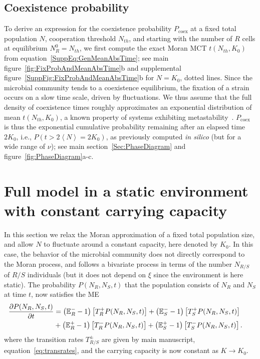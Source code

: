 \documentclass{article}
\begin{document}
\subsection{Coexistence probability}\label{SuppSec:CoexProb}
To derive an expression for the coexistence probability \(P_{\text{coex}}\) at a fixed total population \(N\), cooperation threshold \(N_{th}\), and starting with the number of $R$ cells at equilibrium \(N_R^0=N_{th}\), we first compute the exact Moran MCT \(t(N_{th},K_{0})\) from equation~\eqref{SuppEq:GenMeanAbsTime}; see main figure~\ref{fig:FixProbAndMeanAbsTime}b and supplemental figure~\ref{SuppFig:FixProbAndMeanAbsTime}b for \(N=K_{0}\), dotted lines. Since the microbial community tends to a coexistence equilibrium, the fixation of a strain occurs on a slow time scale, driven by fluctuations. We thus assume that the full density of coexistence times roughly approximates an exponential distribution of mean \(t(N_{th},K_{0})\), a known property of systems exhibiting metastability~\cite{assaf2017}. \(P_{\text{coex}}\) is thus the exponential cumulative probability remaining after an elapsed time \(2K_{0}\), i.e., \(P\left(t>2\left<N\right>=2K_{0}\right)\), as previously computed {\it in silico} (but for a wide range of \(\nu\)); see main section~\ref{Sec:PhaseDiagram} and figure~\ref{fig:PhaseDiagram}a-c.


\section{Full model in a static environment with constant carrying capacity}\label{SuppSec:FluctNFixK}

In this section we relax the Moran approximation of a fixed total population size, and allow \(N\) to fluctuate around a constant capacity, here denoted by \(K_{0}\). In this case, the behavior of the microbial community does not directly correspond to the Moran process, and follows a bivariate process in terms of the number $N_{R/S}$ of $R/S$ individuals (but it does not depend on $\xi$ since the environment is here static). The probability $P(N_R,N_S,t)$ that the population consists of $N_R$ and $N_S$ at time $t$, now satisfies the ME
\begin{align*}
\label{eq:MEbis}
\hspace{-5mm}
\frac{\partial P(N_R,N_S,t)}{\partial t} &=  \left( \mathbb{E}_R^--1\right)\left[T^+_R P(N_R,N_S,t)\right]+\left( \mathbb{E}_S^--1\right)\left[T^+_S P(N_R,N_S,t)\right] \nonumber \\
&+
\left( \mathbb{E}_R^+-1\right)\left[T^-_R P(N_R,N_S,t)\right]  +\left( \mathbb{E}_S^+-1\right)\left[T^-_S P(N_R,N_S,t)\right].
\end{align*}
where the transition rates $T^{\pm}_{R/S}$ are given by main manuscript, equation~\eqref{eq:transrates}, and the carrying capacity is now constant as $K\to K_0$.
\end{document}

